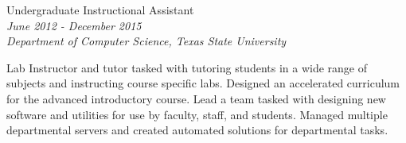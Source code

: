 \documentclass[10pt]{article} %
\begin{document}
\begin{minipage}[t]{0.5\textwidth}
{\raggedright\large Undergraduate Instructional Assistant\\
\small \textit{June 2012 - December 2015} \\
\small \textit{Department of Computer Science, Texas State University}\\[5pt]}

\normalsize{Lab Instructor and tutor tasked with tutoring students in a wide range of subjects and instructing course specific labs. Designed an accelerated curriculum for the advanced introductory course. Lead a team tasked with designing new software and utilities for use by faculty, staff, and students. Managed multiple departmental servers and created automated solutions for departmental tasks.}\\

\end{minipage}
\hfill
\end{document}
